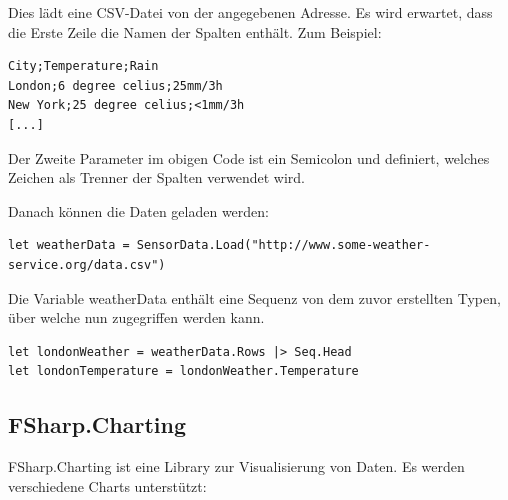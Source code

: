 Dies lädt eine CSV-Datei von der angegebenen Adresse. Es wird erwartet, dass die Erste Zeile die Namen der Spalten enthält. Zum Beispiel:

\begin{lstlisting}
City;Temperature;Rain
London;6 degree celius;25mm/3h
New York;25 degree celius;<1mm/3h
[...]
\end{lstlisting}

Der Zweite Parameter im obigen Code ist ein Semicolon und definiert, welches Zeichen als Trenner der Spalten verwendet wird.

Danach können die Daten geladen werden:
\begin{lstlisting}
let weatherData = SensorData.Load("http://www.some-weather-service.org/data.csv")
\end{lstlisting}

Die Variable weatherData enthält eine Sequenz von dem zuvor erstellten Typen, über welche nun zugegriffen werden kann.

\begin{lstlisting}
let londonWeather = weatherData.Rows |> Seq.Head
let londonTemperature = londonWeather.Temperature
\end{lstlisting}

\subsection{FSharp.Charting}
FSharp.Charting ist eine Library zur Visualisierung von Daten. 
Es werden verschiedene Charts unterstützt:



